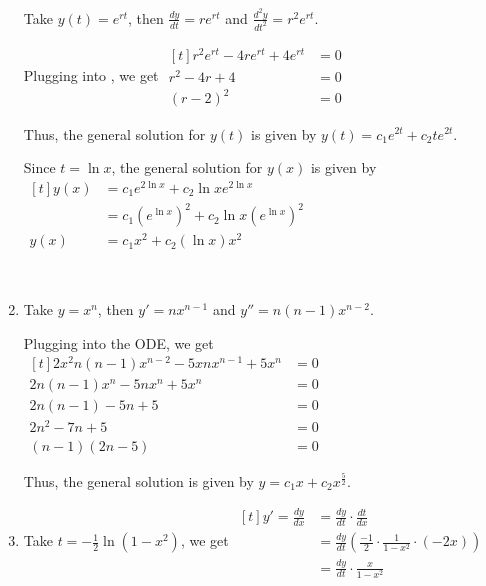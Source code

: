 \begin{enumerate}
    Take $y(t) = e^{rt}$, then $\frac{dy}{dt} = re^{rt}$ and $\frac{d^2y}{dt^2} = r^2e^{rt}$. 

    Plugging into , we get $\begin{aligned}[t]
        r^2e^{rt} - 4re^{rt} + 4e^{rt} & = 0 \\
        r^2 - 4r + 4                   & = 0 \\
        (r - 2)^2                      & = 0
    \end{aligned}$

    Thus, the general solution for $y(t)$ is given by $y(t) = c_1e^{2t} + c_2te^{2t}$. 

    Since $t = \ln x$, the general solution for $y(x)$ is given by $\begin{aligned}[t]
        y(x) & = c_1e^{2\ln{x}} + c_2 \ln{x} e^{2\ln{x}}                                  \\
             & = c_1 \left( e^{\ln{x}} \right)^2 + c_2 \ln{x} \left( e^{\ln{x}} \right)^2 \\
        y(x) & = c_1 x^2 + c_2 (\ln{x}) x^2
    \end{aligned}$

    {~~~}

    \item Take $y = x^n$, then $y' = nx^{n-1}$ and $y'' = n(n - 1)x^{n-2}$.
    
    Plugging into the ODE, we get $\begin{aligned}[t]
        2x^2n(n-1)x^{n-2} - 5xnx^{n-1} + 5x^n & = 0 \\
        2n(n - 1)x^n - 5nx^n + 5x^n           & = 0 \\
        2n(n - 1) - 5n + 5                    & = 0 \\
        2n^2 - 7n + 5                         & = 0 \\
        (n - 1)(2n - 5)                       & = 0
    \end{aligned}$

    Thus, the general solution is given by $y = c_1 x + c_2 x^{\frac{5}{2}}$. 

    \item Take $t = -\frac{1}{2} \ln(1 - x^2)$, we get $\begin{aligned}[t]
        y' = \frac{dy}{dx} & = \frac{dy}{dt} \cdot \frac{dt}{dx}                      \\
                           & = \frac{dy}{dt} \left( \frac{-1}{2} \cdot \frac{1}{1 - x^2} \cdot (-2x) \right) \\
                           & = \frac{dy}{dt} \cdot \frac{x}{1 - x^2}
    \end{aligned}$
        

\end{enumerate}
